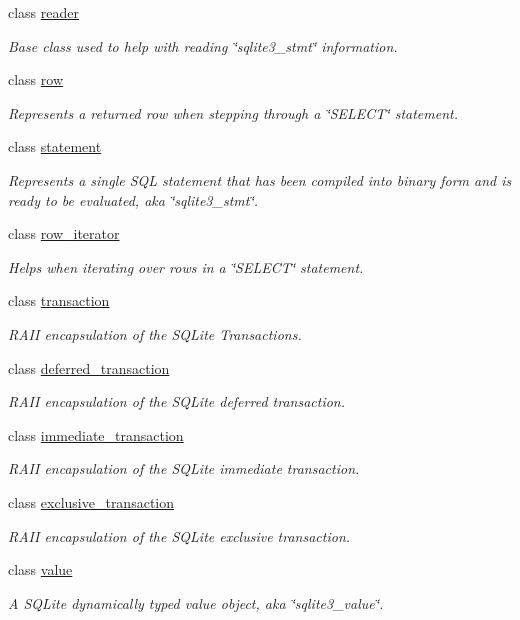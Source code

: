 \begin{DoxyCompactItemize}
class \hyperlink{a00010}{reader}
\begin{DoxyCompactList}\small\item\em Base class used to help with reading \char`\"{}sqlite3\-\_\-stmt\char`\"{} information. \end{DoxyCompactList}\item 
class \hyperlink{a00011}{row}
\begin{DoxyCompactList}\small\item\em Represents a returned row when stepping through a \char`\"{}\-S\-E\-L\-E\-C\-T\char`\"{} statement. \end{DoxyCompactList}\item 
class \hyperlink{a00013}{statement}
\begin{DoxyCompactList}\small\item\em Represents a single S\-Q\-L statement that has been compiled into binary form and is ready to be evaluated, aka \char`\"{}sqlite3\-\_\-stmt\char`\"{}. \end{DoxyCompactList}\item 
class \hyperlink{a00012}{row\-\_\-iterator}
\begin{DoxyCompactList}\small\item\em Helps when iterating over rows in a \char`\"{}\-S\-E\-L\-E\-C\-T\char`\"{} statement. \end{DoxyCompactList}\item 
class \hyperlink{a00014}{transaction}
\begin{DoxyCompactList}\small\item\em R\-A\-I\-I encapsulation of the S\-Q\-Lite Transactions. \end{DoxyCompactList}\item 
class \hyperlink{a00005}{deferred\-\_\-transaction}
\begin{DoxyCompactList}\small\item\em R\-A\-I\-I encapsulation of the S\-Q\-Lite deferred transaction. \end{DoxyCompactList}\item 
class \hyperlink{a00008}{immediate\-\_\-transaction}
\begin{DoxyCompactList}\small\item\em R\-A\-I\-I encapsulation of the S\-Q\-Lite immediate transaction. \end{DoxyCompactList}\item 
class \hyperlink{a00007}{exclusive\-\_\-transaction}
\begin{DoxyCompactList}\small\item\em R\-A\-I\-I encapsulation of the S\-Q\-Lite exclusive transaction. \end{DoxyCompactList}\item 
class \hyperlink{a00015}{value}
\begin{DoxyCompactList}\small\item\em A S\-Q\-Lite dynamically typed value object, aka \char`\"{}sqlite3\-\_\-value\char`\"{}. \end{DoxyCompactList}\end{DoxyCompactItemize}
